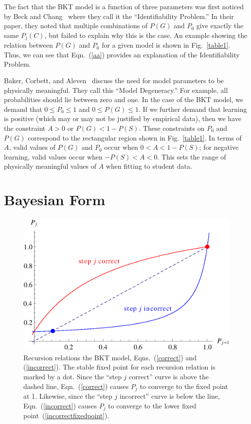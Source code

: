\documentclass{acmlarge-edm}
\begin{document}
The fact that the BKT model is a function of three parameters
was first noticed by Beck and Chang~\cite{beck_identifiability:_2007} 
where they call it the ``Identifiability Problem.''   In their paper, 
they noted that multiple
combinations of $P(G)$ and $P_0$ give exactly the same $P_j(C)$, but
failed to explain why this is the case.  An example showing the relation
between $P(G)$ and $P_0$ for a given model is shown in Fig.~\ref{table1}.
Thus, we can see that Eqn.~(\ref{aa}) provides an explanation of the
Identifiability Problem.

Baker, Corbett, and Aleven~\cite{baker_more_2008} discuss the need for 
model parameters to be physically meaningful.  They call this 
``Model Degeneracy.''   For example, all probabilities should lie between zero and one.  
In the case of the BKT model, we demand that $0\le P_0\le 1$ and
 $0\le P(G) \le 1$.
If we further demand that learning is positive (which may or may not be justified
by empirical data), then we have the constraint $A>0$ or $P(G)<1-P(S)$.
These constraints on $P_0$ and $P(G)$ correspond to the rectangular region shown in Fig.~\ref{table1}.
In terms of $A$, valid values of $P(G)$ and $P_0$ occur when
$0<A<1-P(S)$; for negative learning, valid values occur when
$-P(S)<A<0$.  This sets the range of physically meaningful values of
$A$ when fitting to student data.

\section{Bayesian Form}

\begin{figure}
\centering\includegraphics{p-recursion.eps}
\caption{
  Recursion relations the BKT model, Eqns.~(\ref{correct}) and 
  (\ref{incorrect}).
  The stable fixed point for each recursion relation is marked
  by a dot.  Since the ``step $j$ correct'' curve is above the
  dashed line, Eqn.~(\ref{correct}) causes $P_j$ to 
   converge to the fixed point at 1.  Likewise, since 
   the ``step $j$ incorrect'' curve is below the line, 
   Eqn.~(\ref{incorrect}) causes $P_j$ to converge 
   to the lower fixed point~(\ref{incorrectfixedpoint}).
 }
 \label{p-recursion}
\end{figure}
\end{document}
